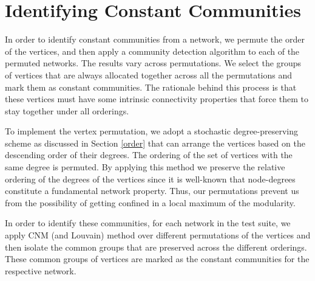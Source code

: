 \section{Identifying Constant Communities} In order to identify constant communities from a network, we permute the order of the vertices,
and then apply a
community detection algorithm to each of the permuted networks. The results vary across permutations. We select the groups of vertices that
are always allocated together across all the permutations and mark them as constant communities. The rationale behind this process is
that these vertices must have some intrinsic connectivity properties that force them to stay together under all orderings.


\begin{table}[!t]
 \centering
\caption{Comparison of the constant communities obtained from Louvain (LVN) with those obtained from CNM and Infomap (INFO) algorithms using
NMI.}\label{nmi_real}
\end{table}

To implement the vertex permutation, we adopt a stochastic degree-preserving scheme as discussed in Section \ref{order} that can arrange the
vertices based on the descending
order of their degrees.  The ordering of the set of vertices with the same degree is permuted. By applying this method we preserve the
relative ordering of the degrees of the vertices since it is well-known that node-degrees constitute a fundamental network property. 
Thus, our permutations prevent us from the
possibility of getting confined in a local maximum of the modularity.

In order to identify these
communities, for each network in the test suite, we apply CNM (and Louvain) method over different permutations of the vertices and
then
isolate the common groups that are preserved across the different orderings. These common groups of vertices are
marked as the constant communities for the respective
network.

